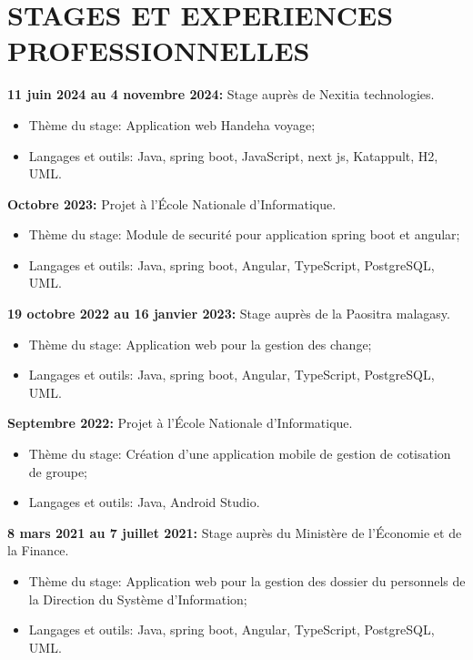 \documentclass[12pt]{report}
\begin{document}
			\section*{STAGES ET EXPERIENCES PROFESSIONNELLES}
				\begin{minipage}{\textwidth}
       					 \textbf{11 juin 2024 au 4 novembre 2024:} Stage auprès de Nexitia technologies.
						\begin{itemize}
							\item Thème du stage: Application web Handeha voyage;
							\item Langages et outils: Java, spring boot, JavaScript, next js, Katappult, H2, UML.						
						\end{itemize}
       					 \textbf{Octobre 2023:} Projet à l’École Nationale d'Informatique.
						\begin{itemize}
							\item Thème du stage: Module de securité pour application spring boot et angular;
							\item Langages et outils: Java, spring boot, Angular, TypeScript, PostgreSQL, UML.						
						\end{itemize}       					 
					\textbf{19 octobre 2022 au 16 janvier 2023:} Stage auprès de la Paositra malagasy.
						\begin{itemize}
							\item Thème du stage: Application web pour la gestion des change;
							\item Langages et outils: Java, spring boot, Angular, TypeScript, PostgreSQL, UML.								
						\end{itemize}
					\textbf{Septembre 2022:} Projet à l’École Nationale d'Informatique.
						\begin{itemize}
							\item Thème du stage: Création d'une application mobile de gestion de cotisation de groupe;
							\item Langages et outils: Java, Android Studio.								
						\end{itemize}
					\textbf{8 mars 2021 au 7 juillet 2021:} Stage auprès du Ministère de l’Économie et de la Finance.
						\begin{itemize}
							\item Thème du stage: Application web pour la gestion des dossier du personnels de la Direction du Système d'Information;
							\item Langages et outils: Java, spring boot, Angular, TypeScript, PostgreSQL, UML.								
						\end{itemize} 

\end{minipage}
\end{document}
